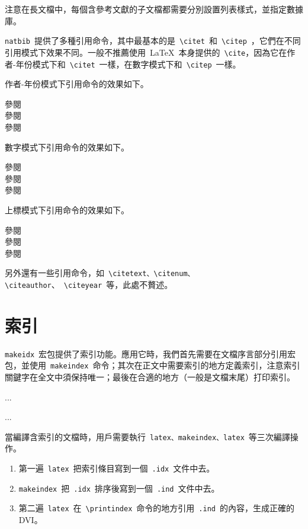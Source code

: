 注意在長文檔中，每個含參考文獻的子文檔都需要分別設置列表樣式，並指定數據庫。

\verb|natbib|~提供了多種引用命令，其中最基本的是~\verb|\citet|~和~\verb|\citep|~，它們在不同引用模式下效果不同。一般不推薦使用~\LaTeX~本身提供的~\verb|\cite|，因為它在作者-年份模式下和~\verb|\citet|~一樣，在數字模式下和~\verb|\citep|~一樣。

作者-年份模式下引用命令的效果如下。
\begin{demo}
參閱\cite{Daly_2007}\\
參閱\citet{Daly_2007}\\
參閱\citep{Daly_2007}
\end{demo}

數字模式下引用命令的效果如下。
\begin{demo}
參閱\cite{Daly_2007}\\
參閱\citet{Daly_2007}\\
參閱\citep{Daly_2007}
\end{demo}

上標模式下引用命令的效果如下。
\begin{demo}
參閱\cite{Daly_2007}\\
參閱\citet{Daly_2007}\\
參閱\citep{Daly_2007}
\end{demo}

另外還有一些引用命令，如~\verb|\citetext、\citenum、\citeauthor|、~\verb|\citeyear|~等，此處不贅述。

\section{索引}
\verb|makeidx|~宏包提供了索引功能。應用它時，我們首先需要在文檔序言部分引用宏包，並使用~\verb|makeindex|~命令；其次在正文中需要索引的地方定義索引，注意索引關鍵字在全文中須保持唯一；最後在合適的地方（一般是文檔末尾）打印索引。

\begin{code}
\usepackage{makeidx}
\makeindex
...

...
\printindex

\end{code}

當編譯含索引的文檔時，用戶需要執行~\verb|latex、makeindex、latex|~等三次編譯操作。

\begin{enumerate}
    \item 第一遍~\verb|latex|~把索引條目寫到一個~\verb|.idx|~文件中去。
    \item \verb|makeindex|~把~\verb|.idx|~排序後寫到一個~\verb|.ind|~文件中去。
    \item 第二遍~\verb|latex|~在~\verb|\printindex|~命令的地方引用~\verb|.ind|~的內容，生成正確的DVI。
\end{enumerate}

